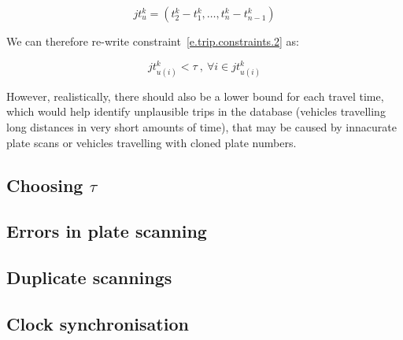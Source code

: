 \begin{equation} \label{e.journeytime}
jt^{k}_{u} = \left(t^{k}_{2} - t^{k}_{1}, \ldots, t^{k}_{n} - t^{k}_{n-1} \right)
\end{equation}

We can therefore re-write constraint~\ref{e.trip.constraints.2} as:

\begin{equation} \label{e.valid.trip.jt}
jt^{k}_{u(i)} < \tau \ , \ \forall i \in jt^{k}_{u(i)}
\end{equation}

However, realistically, there should also be a lower bound for each travel time, which would help identify unplausible trips in the database (vehicles travelling long distances in very short amounts of time), that may be caused by innacurate plate scans or vehicles travelling with cloned plate numbers.

\subsection{Choosing $\tau$}

\subsection{Errors in plate scanning}

\subsection{Duplicate scannings}

\subsection{Clock synchronisation}


